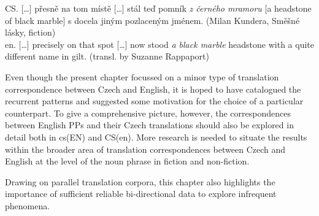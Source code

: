 \documentclass[output=paper]{langscibook}
\begin{document}
\ea\label{ex:mala:12}
CS. […] přesně na tom místě […] stál teď pomník \textit{z černého mramoru} [a headstone of black marble] s docela jiným pozlaceným jménem. (Milan Kundera, Směšné lásky, fiction)\\
en. […] precisely on that spot […] now stood \textit{a black marble} headstone with a quite different name in gilt. (transl. by Suzanne Rappaport)\\
\z

Even though the present chapter focussed on a minor type of translation correspondence between Czech and English, it is hoped to have catalogued the recurrent patterns and suggested some motivation for the choice of a particular counterpart. To give a comprehensive picture, however, the correspondences between English PPs and their Czech translations should also be explored in detail both in cs(EN) and CS(en). More research is needed to situate the results within the broader area of translation correspondences between Czech and English at the level of the noun phrase in fiction and non-fiction.

Drawing on parallel translation corpora, this chapter also highlights the importance of sufficient reliable bi-directional data to explore infrequent phenomena.

\sloppy\printbibliography[heading=subbibliography,notkeyword=this]
\end{document}
